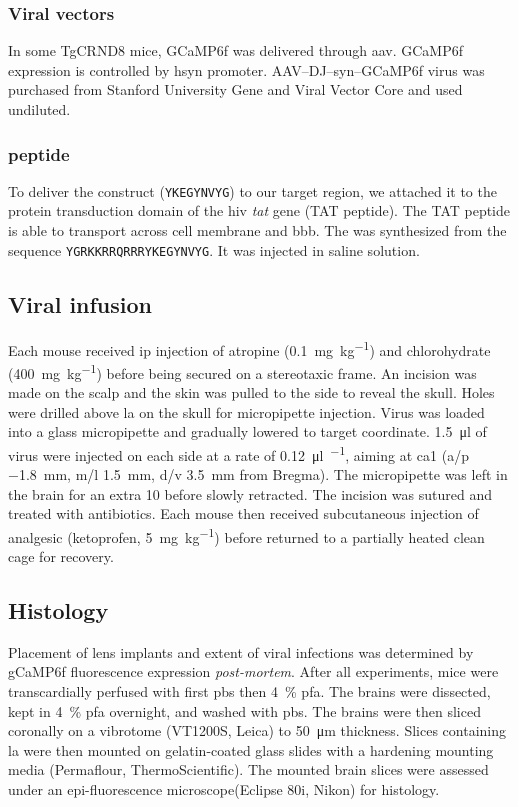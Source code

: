 \subsubsection{Viral vectors}
In some TgCRND8 mice, GCaMP6f was delivered through \gls{aav}. GCaMP6f expression is controlled by \gls{hsyn} promoter. AAV--DJ--syn--GCaMP6f virus was purchased from Stanford University Gene and Viral Vector Core and used undiluted. 

\subsubsection{\tglu{} peptide}
To deliver the \glu{} construct (\texttt{YKEGYNVYG}) to our target region, we attached it to the protein transduction domain of the \gls{hiv} \textit{tat} gene (TAT peptide). The TAT peptide is able to transport across cell membrane and \gls{bbb}. The \tglu{} was synthesized from the sequence \texttt{YGRKKRRQRRRYKEGYNVYG}. It was injected in saline solution.


\subsection{Viral infusion}

Each mouse received \gls{ip} injection of atropine (\SI{0.1}{\mg\per\kg}) and chlorohydrate (\SI{400}{\mg\per\kg}) before being secured on a stereotaxic frame. An incision was made on the scalp and the skin was pulled to the side to reveal the skull. Holes were drilled above \gls{la} on the skull for micropipette injection. Virus was loaded into a glass micropipette and gradually lowered to target coordinate. \SI{1.5}{\ul} of virus were injected on each side at a rate of \SI{0.12}{\ul\per\min}, aiming at \gls{ca1} (\gls{a/p} \SI{-1.8}{\mm}, \gls{m/l} \SI{1.5}{\mm}, \gls{d/v} \SI{3.5}{\mm} from Bregma). The micropipette was left in the brain for an extra \SI{10}{\min} before slowly retracted. The incision was sutured and treated with antibiotics. Each mouse then received subcutaneous injection of analgesic (ketoprofen, \SI{5}{\mg\per\kg}) before returned to a partially heated clean cage for recovery.

\subsection{Histology}
Placement of lens implants and extent of viral infections was determined by gCaMP6f fluorescence expression \textit{post-mortem}. After all experiments, mice were transcardially perfused with first \gls{pbs} then \SI{4}{\percent} \gls{pfa}. The brains were dissected,  kept in \SI{4}{\percent} \gls{pfa} overnight, and washed with \gls{pbs}. The brains were then sliced coronally on a vibrotome (VT1200S, Leica) to \SI{50}{\um} thickness. Slices containing \gls{la} were then mounted on gelatin-coated glass slides with a hardening mounting media (Permaflour, ThermoScientific). The mounted brain slices were assessed under an epi-fluorescence microscope(Eclipse 80i, Nikon) for histology.


